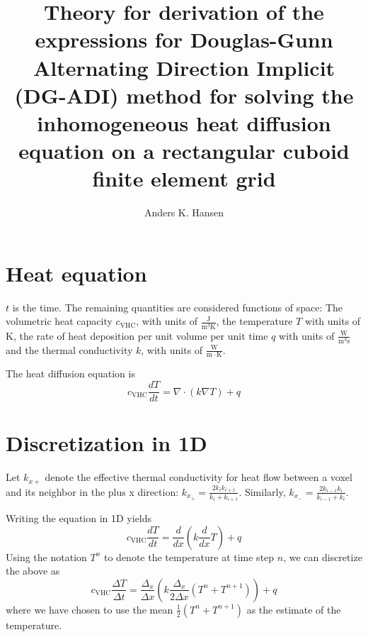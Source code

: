 \documentclass{scrartcl}
\title{Theory for derivation of the expressions for Douglas-Gunn Alternating Direction Implicit (DG-ADI) method for solving the inhomogeneous heat diffusion equation on a rectangular cuboid finite element grid}
\author{Anders K. Hansen}
\newcommand{\VHC}{c_\mathrm{VHC}}
\begin{document}
\maketitle

\section{Heat equation}
$t$ is the time. The remaining quantities are considered functions of space: The volumetric heat capacity $\VHC$, with units of $\mathrm{\frac J {m^3 K}}$, the temperature $T$ with units of $\mathrm K$, the rate of heat deposition per unit volume per unit time $q$ with units of $\mathrm{\frac W {m^3 s}}$ and the thermal conductivity $k$, with units of $\mathrm{\frac W {m \cdot K}}$.

The heat diffusion equation is
\begin{equation}
\VHC \frac{dT}{dt} = \nabla \cdot \left(k \nabla T\right) + q
\end{equation}

\section{Discretization in 1D}
Let $k_{x+}$ denote the effective thermal conductivity for heat flow between a voxel and its neighbor in the plus x direction: $k_{x_+} = \frac{2k_ik_{i+1}}{k_i + k_{i+1}}$. Similarly, $k_{x_-} = \frac{2k_{i-1}k_i}{k_{i-1} + k_i}$.

Writing the equation in 1D yields
\begin{equation} \label{1Dcont}
\VHC \frac{dT}{dt} = \frac d {dx} \left( k \frac d {dx} T \right) + q
\end{equation}
Using the notation $T^n$ to denote the temperature at time step $n$, we can discretize the above as
\begin{equation}
\VHC \frac{\Delta T}{\Delta t} = \frac{\Delta_x}{\Delta x} \left( k \frac{\Delta_x}{2\Delta x} \left( T^n + T^{n+1} \right) \right) + q
\end{equation}
where we have chosen to use the mean $\frac 1 2 \left( T^n + T^{n+1} \right)$ as the estimate of the temperature.
\end{document}
